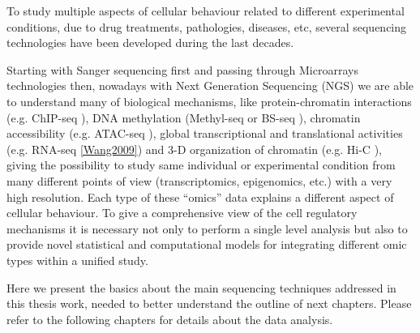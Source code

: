 To study multiple aspects of cellular behaviour related to different experimental conditions, due to drug treatments, pathologies, diseases, etc, several sequencing technologies have been developed during the last decades.

Starting with Sanger sequencing first and passing through Microarrays technologies then, nowadays with Next Generation Sequencing (NGS) we are able to understand many of biological mechanisms, like protein-chromatin interactions (e.g. ChIP-seq \cite{Park2009}), DNA methylation (Methyl-seq or BS-seq \cite{Frommer1992}), chromatin accessibility (e.g. ATAC-seq \cite{Buenrostro2013}), global transcriptional and translational activities (e.g. RNA-seq \ref{Wang2009}) and 3-D organization of chromatin (e.g. Hi-C \cite{VanBerkum2010}), giving the possibility to study same individual or experimental condition from many different points of view (transcriptomics, epigenomics, etc.) with a very high resolution. Each type of these “omics” data explains a different aspect of cellular behaviour. To give a comprehensive view of the cell regulatory mechanisms it is necessary not only to perform a single level analysis but also to provide novel statistical and computational models for integrating different omic types within a unified study.

Here we present the basics about the main sequencing techniques addressed in this thesis work, needed to better understand the outline of next chapters.
Please refer to the following chapters for details about the data analysis.
